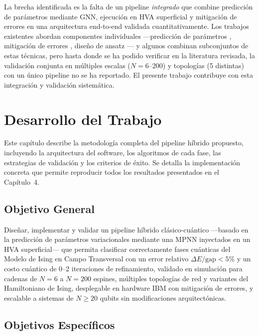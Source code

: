 \documentclass[11pt,a4paper,spanish]{book}
\begin{document}
La brecha identificada es la falta de un pipeline \emph{integrado} que combine predicción de parámetros mediante GNN, ejecución en HVA superficial y mitigación de errores en una arquitectura end-to-end validada cuantitativamente. Los trabajos existentes abordan componentes individuales ---predicción de parámetros \citep{miao2024, zhang2025}, mitigación de errores \citep{kim2023, uvarov2024}, diseño de ansatz \citep{wiersema2020, tripathi2026}--- y algunos combinan subconjuntos de estas técnicas, pero hasta donde se ha podido verificar en la literatura revisada, la validación conjunta en múltiples escalas ($N = 6$--$200$) y topologías (5 distintas) con un único pipeline no se ha reportado. El presente trabajo contribuye con esta integración y validación sistemática.



\chapter{Desarrollo del Trabajo}

Este capítulo describe la metodología completa del pipeline híbrido propuesto, incluyendo la arquitectura del software, los algoritmos de cada fase, las estrategias de validación y los criterios de éxito. Se detalla la implementación concreta que permite reproducir todos los resultados presentados en el Capítulo~4.

\section{Objetivo General}

Diseñar, implementar y validar un pipeline híbrido clásico-cuántico ---basado en la predicción de parámetros variacionales mediante una MPNN inyectados en un HVA superficial--- que permita clasificar correctamente fases cuánticas del Modelo de Ising en Campo Transversal con un error relativo $\Delta E/\text{gap} < 5\%$ y un costo cuántico de 0--2 iteraciones de refinamiento, validado en simulación para cadenas de $N = 6$ a $N = 200$ espines, múltiples topologías de red y variantes del Hamiltoniano de Ising, desplegable en hardware IBM con mitigación de errores, y escalable a sistemas de $N \geq 20$ qubits sin modificaciones arquitectónicas.

\section{Objetivos Específicos}
\end{document}
